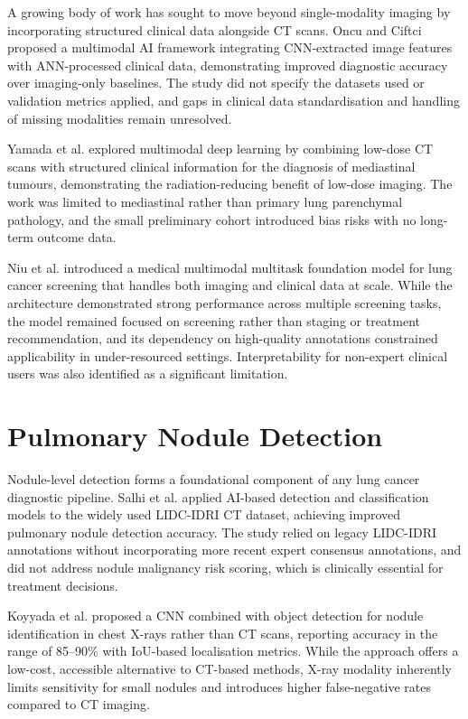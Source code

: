 {A growing body of work has sought to move beyond single-modality imaging by incorporating
structured clinical data alongside CT scans. Oncu and Ciftci \cite{oncu2025} proposed a
multimodal AI framework integrating CNN-extracted image features with ANN-processed
clinical data, demonstrating improved diagnostic accuracy over imaging-only baselines.
The study did not specify the datasets used or validation metrics applied, and gaps in
clinical data standardisation and handling of missing modalities remain unresolved.

Yamada et al. \cite{yamada2024} explored multimodal deep learning by combining low-dose
CT scans with structured clinical information for the diagnosis of mediastinal tumours,
demonstrating the radiation-reducing benefit of low-dose imaging. The work was limited
to mediastinal rather than primary lung parenchymal pathology, and the small preliminary
cohort introduced bias risks with no long-term outcome data.

Niu et al. \cite{niu2025} introduced a medical multimodal multitask foundation model for
lung cancer screening that handles both imaging and clinical data at scale. While the
architecture demonstrated strong performance across multiple screening tasks, the model
remained focused on screening rather than staging or treatment recommendation, and its
dependency on high-quality annotations constrained applicability in under-resourced
settings. Interpretability for non-expert clinical users was also identified as a
significant limitation.

\section{Pulmonary Nodule Detection}

Nodule-level detection forms a foundational component of any lung cancer diagnostic
pipeline. Salhi et al. \cite{salhi2026} applied AI-based detection and classification
models to the widely used LIDC-IDRI CT dataset, achieving improved pulmonary nodule
detection accuracy. The study relied on legacy LIDC-IDRI annotations without
incorporating more recent expert consensus annotations, and did not address nodule
malignancy risk scoring, which is clinically essential for treatment decisions.

Koyyada et al. \cite{koyyada2023} proposed a CNN combined with object detection for
nodule identification in chest X-rays rather than CT scans, reporting accuracy in the
range of 85--90\% with IoU-based localisation metrics. While the approach offers a
low-cost, accessible alternative to CT-based methods, X-ray modality inherently limits
sensitivity for small nodules and introduces higher false-negative rates compared to CT
imaging.

}
